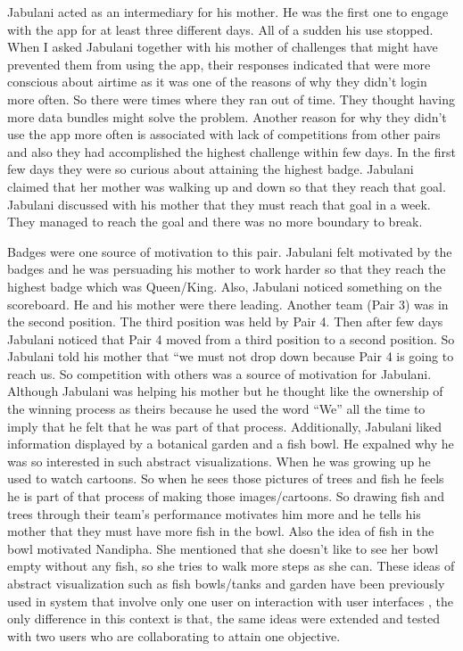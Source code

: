 Jabulani acted as an intermediary for his mother. He was the first one to engage with the app for at least three different days. All of a sudden his use stopped. When I asked Jabulani together with his mother of challenges that might have prevented them from using the app, their responses indicated that were more conscious about airtime as it was one of the reasons of why they didn't  login more often. So there were times where they ran out of time. They thought having more data bundles might solve the problem. Another reason for why they didn't use the app more often is associated with lack of competitions from other pairs and also they had accomplished the highest challenge within few days. In the first few days they were so curious about attaining the highest badge. Jabulani claimed that her mother was walking up and down so that they reach that goal. Jabulani discussed with his mother that they must reach that goal in  a week. They managed to reach the goal and there was no more boundary to break.

Badges were one source of motivation to this pair. Jabulani felt motivated by the badges and he was persuading his mother to work harder so that they reach the highest badge which was Queen/King. Also, Jabulani noticed something on the scoreboard. He and his mother were there leading. Another team (Pair 3) was in the second position. The third position was held by Pair 4. Then after few days Jabulani noticed that Pair 4 moved from a third position to a second position. So Jabulani told his mother that ``we must not drop down because Pair 4 is going to reach us. So competition with others was a source of motivation for Jabulani. Although Jabulani was helping his mother but he thought like the ownership of the winning process as theirs because he used the word “We” all the time to imply that he felt that he was part of that process. Additionally, Jabulani liked information displayed by a botanical garden and a fish bowl. He expalned why he was so interested in such abstract visualizations. When he was growing up he used to watch cartoons. So when he sees those pictures of trees and fish he feels he is part of that process of making those images/cartoons. So drawing fish and trees through their team's performance motivates him more and he tells his mother that they must have more fish in the bowl. Also the idea of fish in the bowl motivated Nandipha. She mentioned  that she doesn't like to see her bowl empty without any fish, so she tries to walk more steps as she can. These ideas of abstract visualization such as fish bowls/tanks and garden have been previously used in system that involve only one user on interaction with user interfaces \citep{lin2006:fish, klasnja2009:using}, the only difference in this context is that, the same ideas were extended and tested with two users who are collaborating to attain one objective. 
